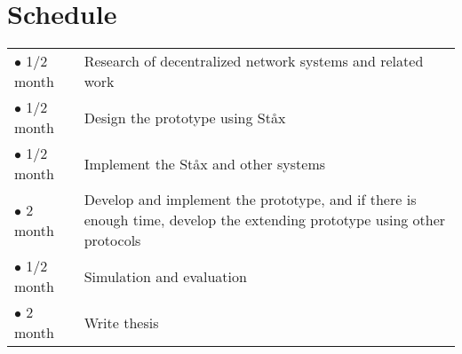 \documentclass{article}
\begin{document}
\section{Schedule}

\begin{table} [h]
	\centering
	\begin{tabular}{ p{2cm} p{13cm} }
		$\bullet$ 1/2 month & Research of decentralized network systems and related work \\
		$\bullet$ 1/2 month & Design the prototype using St\aa x \\
		$\bullet$ 1/2 month & Implement the St\aa x and other systems \\
		$\bullet$ 2 month & Develop and implement the prototype, and if there is enough time, develop the extending prototype using other protocols \\
		$\bullet$ 1/2 month & Simulation and evaluation \\
		$\bullet$ 2 month & Write thesis \\
	\end{tabular}
\end{table}

\newpage



\end{document}
